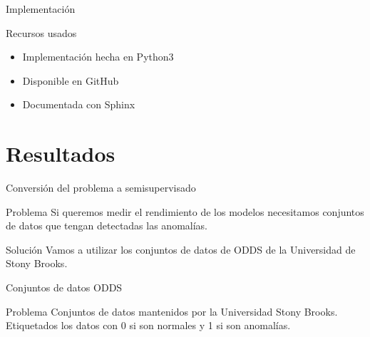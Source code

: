 \documentclass[10pt]{beamer}
\begin{document}
\begin{frame}[fragile]{Implementación}
\vspace{10px}
\pause
{}

\begin{block}{Recursos usados}
	\begin{itemize}
		\item Implementación hecha en Python3
		\pause
		\item Disponible en GitHub
		\pause
		\item Documentada con Sphinx
	\end{itemize}
\end{block}

\end{frame}

\section{Resultados}

\begin{frame}[fragile]{Conversión del problema a semisupervisado}
\vspace{10px}
\pause
{}

\begin{alertblock}{Problema}
	Si queremos medir el rendimiento de los modelos necesitamos conjuntos de datos que tengan detectadas las anomalías.
\end{alertblock}

\pause

\begin{alertblock}{Solución}
	Vamos a utilizar los conjuntos de datos de ODDS de la Universidad de Stony Brooks.
\end{alertblock}

\end{frame}

\begin{frame}[fragile]{Conjuntos de datos ODDS}
\vspace{10px}
\pause
{}

\begin{block}{Problema}
	Conjuntos de datos mantenidos por la Universidad Stony Brooks. Etiquetados los datos con 0 si son normales y 1 si son anomalías.
\end{block}

\end{frame}
\end{document}
